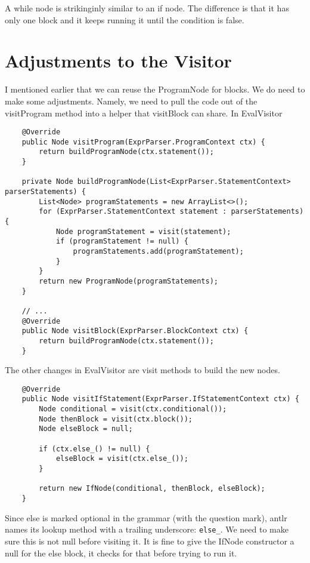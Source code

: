 A while node is strikinginly similar to an if node. The difference is that
it has only one block and it keeps running it until the condition is false.

\section{Adjustments to the Visitor}

I mentioned earlier that we can reuse the ProgramNode for blocks. We do need to
make some adjustments. Namely, we need to pull the code out of the visitProgram
method into a helper that visitBlock can share.
In EvalVisitor

{\footnotesize
\begin{verbatim}
    @Override
    public Node visitProgram(ExprParser.ProgramContext ctx) {
        return buildProgramNode(ctx.statement());
    }

    private Node buildProgramNode(List<ExprParser.StatementContext> parserStatements) {
        List<Node> programStatements = new ArrayList<>();
        for (ExprParser.StatementContext statement : parserStatements) {
            Node programStatement = visit(statement);
            if (programStatement != null) {
                programStatements.add(programStatement);
            }
        }
        return new ProgramNode(programStatements);
    }

    // ...
    @Override
    public Node visitBlock(ExprParser.BlockContext ctx) {
        return buildProgramNode(ctx.statement());
    }
\end{verbatim}
}

The other changes in EvalVisitor are visit methods to build the new nodes.

{\footnotesize
\begin{verbatim}
    @Override
    public Node visitIfStatement(ExprParser.IfStatementContext ctx) {
        Node conditional = visit(ctx.conditional());
        Node thenBlock = visit(ctx.block());
        Node elseBlock = null;

        if (ctx.else_() != null) {
            elseBlock = visit(ctx.else_());
        }

        return new IfNode(conditional, thenBlock, elseBlock);
    }
\end{verbatim}
}

Since else is marked optional in the grammar (with the question mark), antlr
names its lookup method with a trailing underscore: \verb+else_+.
We need to make
sure this is not null before visiting it. It is fine to give the IfNode constructor
a null for the else block, it checks for that before trying to run it.

